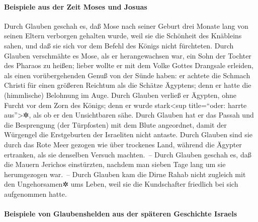 \hypertarget{beispiele-aus-der-zeit-moses-und-josuas}{%
\paragraph{Beispiele aus der Zeit Moses und
Josuas}\label{beispiele-aus-der-zeit-moses-und-josuas}}

 Durch Glauben geschah es, daß Mose nach seiner Geburt
drei Monate lang von seinen Eltern verborgen gehalten wurde, weil sie
die Schönheit des Knäbleins sahen, und daß sie sich vor dem Befehl des
Königs nicht fürchteten.  Durch Glauben verschmähte es
Mose, als er herangewachsen war, ein Sohn der Tochter des Pharaos zu
heißen;  lieber wollte er mit dem Volke Gottes Drangsale
erleiden, als einen vorübergehenden Genuß von der Sünde haben:
 er achtete die Schmach Christi für einen größeren
Reichtum als die Schätze Ägyptens; denn er hatte die (himmlische)
Belohnung im Auge.  Durch Glauben verließ er Ägypten,
ohne Furcht vor dem Zorn des Königs; denn er wurde stark\textless sup
title=``oder: harrte aus''\textgreater✲, als ob er den Unsichtbaren
sähe.  Durch Glauben hat er das Passah und die
Besprengung (der Türpfosten) mit dem Blute angeordnet, damit der
Würgengel die Erstgeburten der Israeliten nicht antaste. 
Durch Glauben sind sie durch das Rote Meer gezogen wie über trockenes
Land, während die Ägypter ertranken, als sie denselben Versuch
machten.~--  Durch Glauben geschah es, daß die Mauern
Jerichos einstürzten, nachdem man sieben Tage lang um sie herumgezogen
war.~--  Durch Glauben kam die Dirne Rahab nicht zugleich
mit den Ungehorsamen✲ ums Leben, weil sie die Kundschafter friedlich bei
sich aufgenommen hatte.

\hypertarget{beispiele-von-glaubenshelden-aus-der-spuxe4teren-geschichte-israels}{%
\paragraph{Beispiele von Glaubenshelden aus der späteren Geschichte
Israels}\label{beispiele-von-glaubenshelden-aus-der-spuxe4teren-geschichte-israels}}

